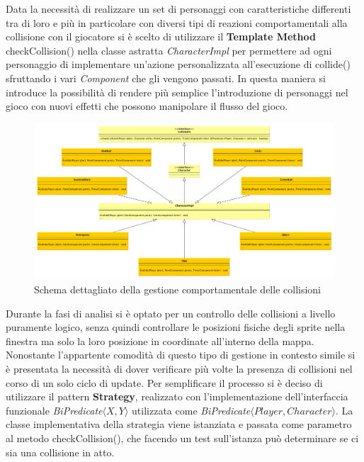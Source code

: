 \documentclass[a4paper,12pt, hidelinks]{report}
\begin{document}
Data la necessità di realizzare un set di personaggi con caratteristiche differenti tra di loro e più in particolare con diversi tipi di reazioni comportamentali alla collisione con il giocatore si è scelto di utilizzare il \textbf{Template Method} checkCollision() nella classe astratta \emph{CharacterImpl} per permettere ad ogni personaggio di implementare un'azione personalizzata all'esecuzione di collide() sfruttando i vari \emph{Component} che gli vengono passati.
In questa maniera si introduce la possibilità di rendere più semplice l'introduzione di personaggi nel gioco con nuovi effetti che possono manipolare il flusso del gioco.

\begin{figure}[H]
\centering{}
\includegraphics[width=\linewidth]{img/CheckCollision}
\caption{Schema dettagliato della gestione comportamentale delle collisioni}
\label{img:CheckCollision}
\end{figure}

Durante la fasi di analisi si è optato per un controllo delle collisioni a livello puramente logico, senza quindi controllare le posizioni fisiche degli sprite nella finestra ma solo la loro posizione in coordinate all'interno della mappa. Nonostante l'appartente comodità di questo tipo di gestione in contesto simile si è presentata la necessità di dover verificare più volte la presenza di collisioni nel corso di un solo ciclo di update. Per semplificare il processo si è deciso di utilizzare il pattern \textbf{Strategy}, realizzato con l'implementazione dell'interfaccia funzionale \emph{BiPredicate$\langle X, Y \rangle$} utilizzata come \emph{BiPredicate$\langle Player, Character \rangle$}. La classe implementativa della strategia viene istanziata e passata come parametro al metodo checkCollision(), che facendo un test sull'istanza può determinare se ci sia una collisione in atto.
\end{document}
